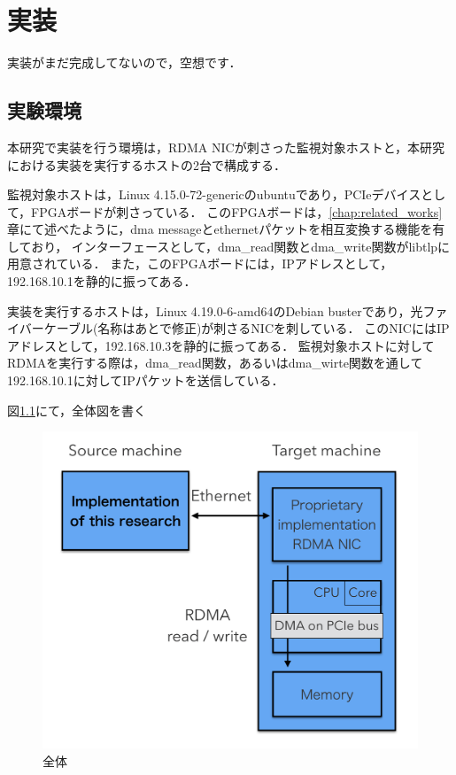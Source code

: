 \chapter{実装}
\label{chap:implementation}

実装がまだ完成してないので，空想です．

\section{実験環境}

本研究で実装を行う環境は，RDMA NICが刺さった監視対象ホストと，本研究における実装を実行するホストの2台で構成する．

監視対象ホストは，Linux 4.15.0-72-genericのubuntuであり，PCIeデバイスとして，FPGAボードが刺さっている．
このFPGAボードは，\ref{chap:related_works}章にて述べたように，dma messageとethernetパケットを相互変換する機能を有しており，
インターフェースとして，dma_read関数とdma_write関数がlibtlpに用意されている．
また，このFPGAボードには，IPアドレスとして，192.168.10.1を静的に振ってある．

実装を実行するホストは，Linux 4.19.0-6-amd64のDebian busterであり，光ファイバーケーブル(名称はあとで修正)が刺さるNICを刺している．
このNICにはIPアドレスとして，192.168.10.3を静的に振ってある．
監視対象ホストに対してRDMAを実行する際は，dma_read関数，あるいはdma_wirte関数を通して192.168.10.1に対してIPパケットを送信している．

図\ref{fig:zentai}にて，全体図を書く

\begin{figure}[htbp]
    \caption{全体}
    \label{fig:zentai}
    \begin{center}
        \includegraphics[bb=0 0 1000 800,width=15cm]{img/zentai.png}
    \end{center}
\end{figure}

